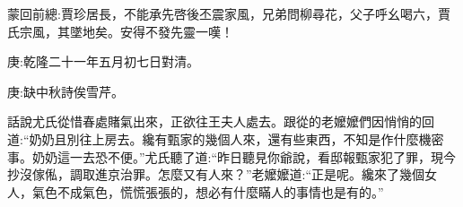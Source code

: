 

\begin{parag}
    \begin{note}蒙回前總:賈珍居長，不能承先啓後丕震家風，兄弟問柳尋花，父子呼幺喝六，賈氏宗風，其墜地矣。安得不發先靈一嘆！\end{note}
\end{parag}


\begin{parag}
    \begin{note}庚:乾隆二十一年五月初七日對清。\end{note}
\end{parag}


\begin{parag}
    \begin{note}庚:缺中秋詩俟雪芹。\end{note}
\end{parag}


\begin{parag}
    話說尤氏從惜春處賭氣出來，正欲往王夫人處去。跟從的老嬤嬤們因悄悄的回道:“奶奶且別往上房去。纔有甄家的幾個人來，還有些東西，不知是作什麼機密事。奶奶這一去恐不便。”尤氏聽了道:“昨日聽見你爺說，看邸報甄家犯了罪，現今抄沒傢俬，調取進京治罪。怎麼又有人來？”老嬤嬤道:“正是呢。纔來了幾個女人，氣色不成氣色，慌慌張張的，想必有什麼瞞人的事情也是有的。”
\end{parag}



